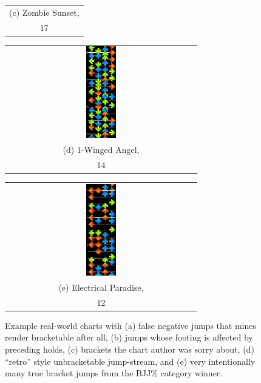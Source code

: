 \documentclass[10pt]{sigplanconf}
\begin{document}
\begin{figure}[t]
\begin{center}
\begin{tabular}{c}
		\\
		(c) Zombie Sunset, \\ 17 \cite{zombie} %
	\end{tabular}
	\begin{tabular}{c}
		\includegraphics[width=0.16\textwidth]{disco-owa.png}
		\\
		(d) 1-Winged Angel, \\ 14 \cite{owa} %
	\end{tabular}
	\begin{tabular}{c}
		\includegraphics[width=0.16\textwidth]{disco-paradise.png}
		\\
		(e) Electrical Paradise, \\ 12 \cite{e-paradise} %
	\end{tabular}
	\end{center}
	\caption{Example real-world charts with
	(a) false negative jumps that mines render bracketable after all,
	(b) jumps whose footing is affected by preceding holds,
	(c) brackets the chart author was sorry about,
	(d) ``retro'' style unbracketable jump-stream, %
	and
	(e) very intentionally many true bracket jumps from the BJJ\% category winner.}
	\label{fig:discussion}
\end{figure}
\end{document}
